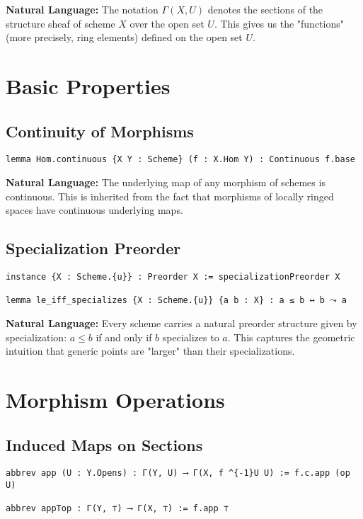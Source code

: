 \documentclass{article}
\theoremstyle{definition}
\begin{document}
\textbf{Natural Language:} The notation $\Gamma(X, U)$ denotes the sections of the structure sheaf of scheme $X$ over the open set $U$. This gives us the "functions" (more precisely, ring elements) defined on the open set $U$.

\section{Basic Properties}

\subsection{Continuity of Morphisms}

\begin{lstlisting}
lemma Hom.continuous {X Y : Scheme} (f : X.Hom Y) : Continuous f.base
\end{lstlisting}

\textbf{Natural Language:} The underlying map of any morphism of schemes is continuous. This is inherited from the fact that morphisms of locally ringed spaces have continuous underlying maps.

\subsection{Specialization Preorder}

\begin{lstlisting}
instance {X : Scheme.{u}} : Preorder X := specializationPreorder X

lemma le_iff_specializes {X : Scheme.{u}} {a b : X} : a ≤ b ↔ b ⤳ a
\end{lstlisting}

\textbf{Natural Language:} Every scheme carries a natural preorder structure given by specialization: $a \leq b$ if and only if $b$ specializes to $a$. This captures the geometric intuition that generic points are "larger" than their specializations.

\section{Morphism Operations}

\subsection{Induced Maps on Sections}

\begin{lstlisting}
abbrev app (U : Y.Opens) : Γ(Y, U) ⟶ Γ(X, f ^{-1}U U) := f.c.app (op U)

abbrev appTop : Γ(Y, ⊤) ⟶ Γ(X, ⊤) := f.app ⊤
\end{lstlisting}
\end{document}
